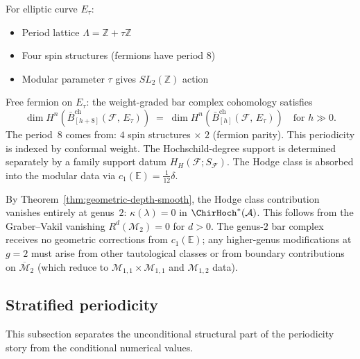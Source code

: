 \begin{example}
For elliptic curve $E_{\tau}$:
\begin{itemize}
\item Period lattice $\Lambda = \mathbb{Z} + \tau\mathbb{Z}$
\item Four spin structures (fermions have period 8)
\item Modular parameter $\tau$ gives $SL_2(\mathbb{Z})$ action
\end{itemize}

Free fermion on $E_{\tau}$: the weight-graded bar complex cohomology satisfies
\[
\dim H^n(\bar{B}^{\mathrm{ch}}_{[h+8]}(\mathcal{F},\, E_{\tau}))
\;=\;
\dim H^n(\bar{B}^{\mathrm{ch}}_{[h]}(\mathcal{F},\, E_{\tau}))
\quad\text{for } h \gg 0.
\]
The period~$8$ comes from: $4$ spin structures $\times$ $2$ (fermion parity).
This periodicity is indexed by conformal weight.  The Hochschild-degree
support is determined separately by a family support datum
$H_H(\mathcal F;S_{\mathcal F})$.
The Hodge class is absorbed into the modular data via
$c_1(\mathbb{E}) = \frac{1}{12}\delta$.
\end{example}

\begin{example}
\label{ex:genus2-hodge-vanishing}
By Theorem~\ref{thm:geometric-depth-smooth}, the Hodge class
contribution vanishes entirely at genus~$2$:
$\kappa(\lambda) = 0$ in $\ChirHoch^*(\mathcal{A})$. This follows from
the Graber--Vakil vanishing $R^d(\mathcal{M}_2) = 0$ for $d > 0$.
The genus-$2$ bar complex receives no geometric corrections from
$c_1(\mathbb{E})$; any higher-genus modifications at $g = 2$ must
arise from other tautological classes or from boundary
contributions on $\overline{\mathcal{M}}_2$ (which reduce to
$\mathcal{M}_{1,1} \times \mathcal{M}_{1,1}$ and
$\mathcal{M}_{1,2}$ data).
\end{example}

\subsection{Stratified periodicity}

This subsection separates the unconditional structural part of the
periodicity story from the conditional numerical values.

